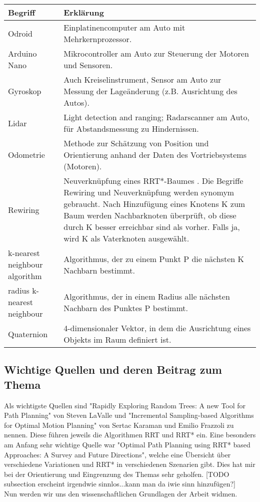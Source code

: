 \begin{tabularx}{\textwidth}{l|X}
 \textbf{Begriff}  & \textbf{Erklärung}  \\
\hline 
Odroid & Einplatinencomputer am Auto mit Mehrkernprozessor. \\
Arduino Nano & Mikrocontroller am Auto zur Steuerung der Motoren und Sensoren.\\
Gyroskop & Auch Kreiselinstrument, Sensor am Auto zur Messung der Lageänderung (z.B. Ausrichtung des Autos).\\
Lidar & Light detection and ranging; Radarscanner am Auto, für Abstandsmessung zu Hindernissen.\\
Odometrie & Methode zur Schätzung von Position und Orientierung anhand der Daten des Vortriebsystems (Motoren).\\
Rewiring & Neuverknüpfung eines RRT*-Baumes \citep{KaFra10}. Die Begriffe Rewiring und Neuverknüpfung werden synomym gebraucht. Nach Hinzufügung eines Knotens K zum Baum werden Nachbarknoten überprüft, ob diese durch K besser erreichbar sind als vorher. Falls ja, wird K als Vaterknoten ausgewählt. \\
k-nearest neighbour algorithm & Algorithmus, der zu einem Punkt P die nächsten K Nachbarn bestimmt.\\
radius k-nearest neighbour & Algorithmus, der in einem Radius alle nächsten Nachbarn des Punktes P bestimmt.\\
Quaternion & 4-dimensionaler Vektor, in dem die Ausrichtung eines Objekts im Raum definiert ist.\\
\end{tabularx}
\subsection{Wichtige Quellen und deren Beitrag zum Thema}
Als wichtigste Quellen sind "Rapidly Exploring Random Trees: A new Tool for Path Planning"\citep{Lav98} von Steven LaValle und "Incremental Sampling-based Algorithms for Optimal Motion Planning" \citep{KaFra10} von Sertac Karaman und Emilio Frazzoli zu nennen. Diese führen jeweils die Algorithmen RRT und RRT* ein. Eine besonders am Anfang sehr wichtige Quelle war "Optimal Path Planning using RRT* based Approaches: A Survey and Future Directions"\citep{NoKhaHa16}, welche eine Übersicht über verschiedene Variationen und RRT* in verschiedenen Szenarien gibt. Dies hat mir bei der Orientierung und Eingrenzung des Themas sehr geholfen. [TODO subsection erscheint irgendwie sinnlos...kann man da iwie sinn hinzufügen?]\\
Nun werden wir uns den wissenschaftlichen Grundlagen der Arbeit widmen.

